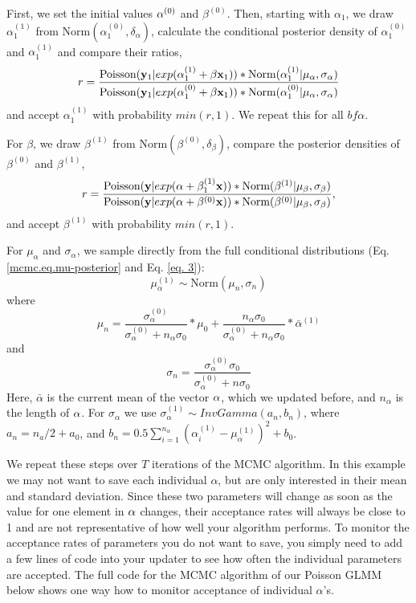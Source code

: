 First, we set the initial values ${\bf \alpha}^{(0)}$ and $\beta^{(0)}$. Then, starting with $\alpha_1$, we draw $\alpha_1^{(1)}$ from $\mbox{Norm}(\alpha_1^{(0)}, \delta_{\alpha})$, calculate the conditional posterior density of $\alpha_1^{(0)}$ and $\alpha_1^{(1)}$  and compare their ratios,
\[
r = \frac{\mbox{Poisson}({\bf y}_{1}|exp(\alpha_1^{(1)} + \beta {\bf x}_1)) *
  \mbox{Norm}(\alpha_1^{(1)}|\mu_{\alpha}, \sigma_{\alpha})} {\mbox{Poisson}({\bf y}_{1}|exp(\alpha_1^{(0)} + \beta {\bf x}_1)) * \mbox{Norm}(\alpha_1^{(0)}|\mu_{\alpha}, \sigma_{\alpha})}
\]
and accept $\alpha_1^{(1)}$ with probability $min(r,1)$. We repeat this for all ${bf \alpha}$.

For $\beta$, we draw $\beta^{(1)}$ from $\mbox{Norm} (\beta^{(0)}, \delta_{\beta})$, compare the posterior densities of $\beta^{(0)}$ and $\beta^{(1)}$,
\[
r = \frac{\mbox{Poisson}({\bf y}|exp({\bf \alpha} + \beta_1^{(1)}{\bf x}))
  *\mbox{Norm}(\beta^{(1)}|\mu_{\beta}, \sigma_{\beta})} { \mbox{Poisson}({\bf
    y}|exp({\bf \alpha} + \beta^{(0)}{\bf x})) *\mbox{Norm}(\beta^{(0)}|\mu_{\beta}, \sigma_{\beta})},
\]
and accept $\beta^{(1)}$  with probability $min(r,1)$.

For $\mu_{\alpha}$ and $\sigma_{\alpha}$, we sample directly from the full conditional distributions (Eq. \ref{mcmc.eq.mu-posterior}  and Eq. \ref{eq. 3}):
\[
\mu_{\alpha}^{(1)} \sim \mbox{Norm} (\mu_n, \sigma_n)
\]
where 
\[\mu_n =  \frac{\sigma_{\alpha}^{(0)}}  {\sigma_{\alpha}^{(0)}   +n_{\alpha}    \sigma_0} *  \mu_0 +  \frac{n_{\alpha}  \sigma_0} {\sigma_{\alpha}^{(0)}   +n_{\alpha} \sigma_0} *\bar{\alpha}^{(1)}
\]
and 
\[
\sigma_n= \frac{\sigma_{\alpha}^{(0)}   \sigma_0 } {\sigma_{\alpha}^{(0)}  + n \sigma_0}
\]
Here, $\bar{\alpha}$ is the current mean of the vector ${\bf\alpha}$, which we
updated before, and $n_{\alpha}$ is the length of ${\bf\alpha}$. 
For $\sigma_{\alpha}$ we use $\sigma_{\alpha}^{(1)}\sim InvGamma (a_n, b_n)$,
where  $a_n = n_a/2   + a_0$, and $b_n = 0.5  \displaystyle\sum\limits_{i=1}^{n_{\alpha}} (\alpha_i^{(1)}-\mu_{\alpha}^{(1)})^2+ b_0$.


We repeat these steps over $T$ iterations of the MCMC algorithm.
In this example we may not want to save each individual $\alpha$, but are only interested in their mean and standard deviation. Since these two parameters will change as soon as the value for one element in $\bf{\alpha}$ changes, their acceptance rates will always be close to 1 and are not representative of how well your algorithm performs. To monitor the acceptance rates of parameters you do not want to save, you simply need to add a few lines of code into your updater to see how often the individual parameters are accepted. The full code for the MCMC algorithm of our Poisson GLMM below shows one way how to monitor acceptance of individual $\alpha$'s.

